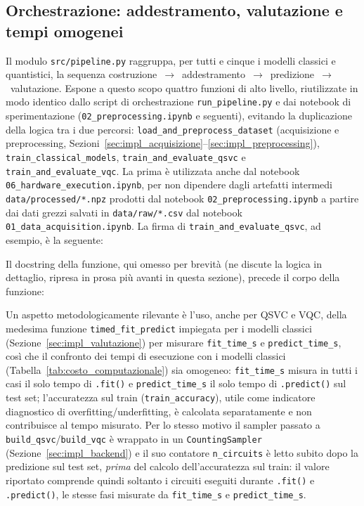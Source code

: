 \subsection{Orchestrazione: addestramento, valutazione e tempi omogenei}
\label{sec:impl_orchestrazione}

Il modulo \texttt{src/pipeline.py} raggruppa, per tutti e cinque i modelli classici e quantistici, la sequenza costruzione~$\to$~addestramento~$\to$~predizione~$\to$~valutazione. Espone a questo scopo quattro funzioni di alto livello, riutilizzate in modo identico dallo script di orchestrazione \texttt{run\_pipeline.py} e dai notebook di sperimentazione (\texttt{02\_preprocessing.ipynb} e seguenti), evitando la duplicazione della logica tra i due percorsi: \texttt{load\_and\_preprocess\_dataset} (acquisizione e preprocessing, Sezioni~\ref{sec:impl_acquisizione}--\ref{sec:impl_preprocessing}), \texttt{train\_classical\_models}, \texttt{train\_and\_evaluate\_qsvc} e \texttt{train\_and\_evaluate\_vqc}. La prima è utilizzata anche dal notebook \texttt{06\_hardware\_execution.ipynb}, per non dipendere dagli artefatti intermedi \texttt{data/processed/*.npz} prodotti dal notebook \newline\texttt{02\_preprocessing.ipynb} a partire dai dati grezzi salvati in \texttt{data/raw/*.csv} dal notebook \texttt{01\_data\_acquisition.ipynb}. La firma di \texttt{train\_and\_evaluate\_qsvc}, ad esempio, è la seguente:



Il docstring della funzione, qui omesso per brevità (ne discute la logica in dettaglio, ripresa in prosa più avanti in questa sezione), precede il corpo della funzione:



Un aspetto metodologicamente rilevante è l'uso, anche per QSVC e VQC, della medesima funzione \texttt{timed\_fit\_predict} impiegata per i modelli classici (Sezione~\ref{sec:impl_valutazione}) per misurare \texttt{fit\_time\_s} e \texttt{predict\_time\_s}, così che il confronto dei tempi di esecuzione con i modelli classici (Tabella~\ref{tab:costo_computazionale}) sia omogeneo: \texttt{fit\_time\_s} misura in tutti i casi il solo tempo di \texttt{.fit()} e \texttt{predict\_time\_s} il solo tempo di \texttt{.predict()} sul test set; l'accuratezza sul train (\texttt{train\_accuracy}), utile come indicatore diagnostico di overfitting/underfitting, è calcolata separatamente e non contribuisce al tempo misurato. Per lo stesso motivo il sampler passato a \texttt{build\_qsvc}/\texttt{build\_vqc} è wrappato in un \texttt{CountingSampler} (Sezione~\ref{sec:impl_backend}) e il suo contatore \texttt{n\_circuits} è letto subito dopo la predizione sul test set, \emph{prima} del calcolo dell'accuratezza sul train: il valore riportato comprende quindi soltanto i circuiti eseguiti durante \texttt{.fit()} e \texttt{.predict()}, le stesse fasi misurate da \texttt{fit\_time\_s} e \texttt{predict\_time\_s}.

